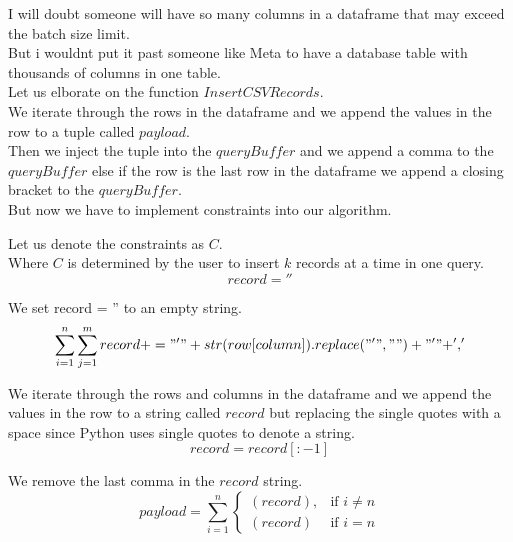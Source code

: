 I will doubt someone will have so many columns in a dataframe that may exceed the batch size limit. \\
But i wouldnt put it past someone like Meta to have a database table with thousands of columns in one table. \\

Let us elborate on the function $InsertCSVRecords$. \\

We iterate through the rows in the dataframe and we append the values in the row to a tuple called $payload$. \\

Then we inject the tuple into the $queryBuffer$ and we append a comma to the $queryBuffer$ else if the row is the last row in the dataframe we append a closing bracket to the $queryBuffer$. \\
But now we have to implement constraints into our algorithm.

Let us denote the constraints as $C$. \\
Where $C$ is determined by the user to insert $k$ records at a time in one query. \\

\begin{equation}
record = ''
\end{equation}

We set record = '' to an empty string. \\

\begin{equation}
\sum_{i=1}^{n} \sum_{j=1}^{m} record+= "'"+str(row[column]).replace("'"," ")+"'" + ',' 
\end{equation}

We iterate through the rows and columns in the dataframe and we append the values in the row to a string called $record$ but replacing the single quotes with a space since Python uses single quotes to denote a string. \\

\begin{equation}
record = record[:-1]
\end{equation}

We remove the last comma in the $record$ string. \\

\begin{equation}
    payload = \sum_{i=1}^{n}
    \begin{cases}
        (record), & \text{if } i \neq n \\
        (record) & \text{if } i = n
    \end{cases}
\end{equation}


